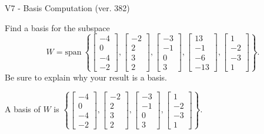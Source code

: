 \begin{exercise}
  \begin{exerciseTitle}V7 - Basis Computation (ver. 382)\end{exerciseTitle}
  \begin{exerciseStatement}
    Find a basis for the subspace 
\[W=\mathrm{span}\ \left\{\left[\begin{array}{r}
-4 \\
0 \\
-4 \\
-2
\end{array}\right] , \left[\begin{array}{r}
-2 \\
2 \\
3 \\
2
\end{array}\right] , \left[\begin{array}{r}
-3 \\
-1 \\
0 \\
3
\end{array}\right] , \left[\begin{array}{r}
13 \\
-1 \\
-6 \\
-13
\end{array}\right] , \left[\begin{array}{r}
1 \\
-2 \\
-3 \\
1
\end{array}\right]\right\}.\]
 Be sure to explain why your result is a basis.


  \end{exerciseStatement}
  \begin{exerciseAnswer}
   A basis of \(W\) is  \(\left\{\left[\begin{array}{r}
-4 \\
0 \\
-4 \\
-2
\end{array}\right] , \left[\begin{array}{r}
-2 \\
2 \\
3 \\
2
\end{array}\right] , \left[\begin{array}{r}
-3 \\
-1 \\
0 \\
3
\end{array}\right] , \left[\begin{array}{r}
1 \\
-2 \\
-3 \\
1
\end{array}\right]\right\}\).
  


  \end{exerciseAnswer}
\end{exercise}